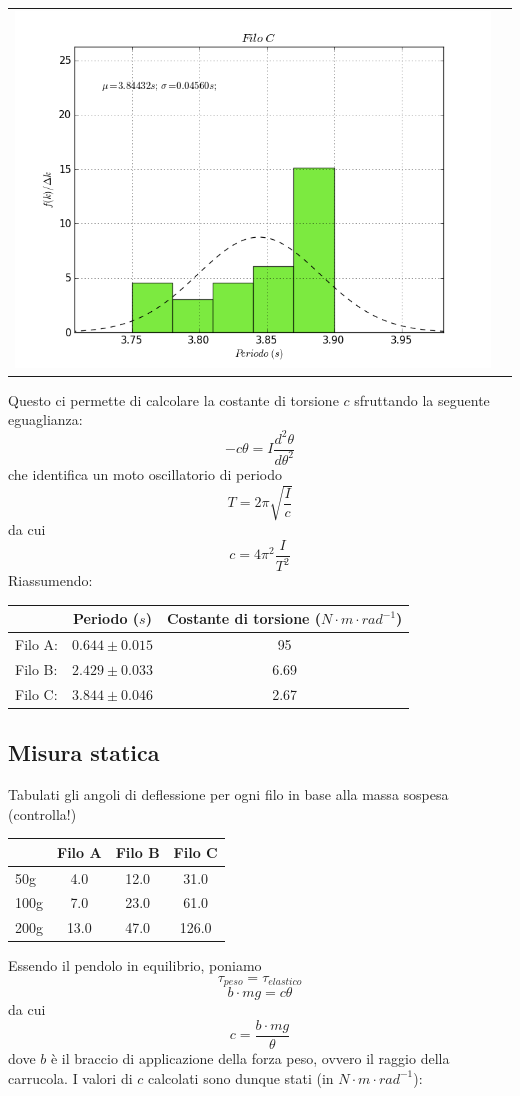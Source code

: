 \begin{tabular}{cc}
\includegraphics[scale=0.4]{../grafici/FiloC.png}\\

\end{tabular}


Questo ci permette di calcolare la costante di torsione $c$ sfruttando la seguente eguaglianza:
$$ -c\theta = I\frac{d^2\theta}{d\theta^2} $$
che identifica un moto oscillatorio di periodo
$$ T = 2\pi \sqrt{\frac{I}{c}}$$
da cui
$$ c = 4\pi^2\frac{I}{T^2} $$
Riassumendo:

\begin{center}
\begin{tabular}{l||c|c}
& Periodo ($s$) & Costante di torsione ($N\cdot m\cdot rad^{-1}$) \\
\midrule
Filo A: & $0.644 \pm 0.015$ & 95 \\
Filo B: & $2.429 \pm 0.033$ & 6.69\\
Filo C: & $3.844 \pm 0.046$ & 2.67\\
\end{tabular}
\end{center}


\subsection{Misura statica}

Tabulati gli angoli di deflessione per ogni filo in base alla massa sospesa (controlla!)\\
\begin{center}
\begin{tabular}{l|ccc}
& Filo A & Filo B & Filo C \\
\midrule
50g & 4.0 & 12.0 & 31.0 \\
100g & 7.0 & 23.0 & 61.0 \\
200g & 13.0 & 47.0 & 126.0 \\
\midrule
\end{tabular}\end{center}
Essendo il pendolo in equilibrio, poniamo
$$ \tau_{peso} = \tau_{elastico} $$
$$ b\cdot mg = c\theta $$
da cui
$$ c = \frac{b\cdot mg}{\theta} $$
dove $b$ è il braccio di applicazione della forza peso, ovvero il raggio della carrucola.
I valori di $c$ calcolati sono dunque stati (in $N\cdot m\cdot rad^{-1}$):

